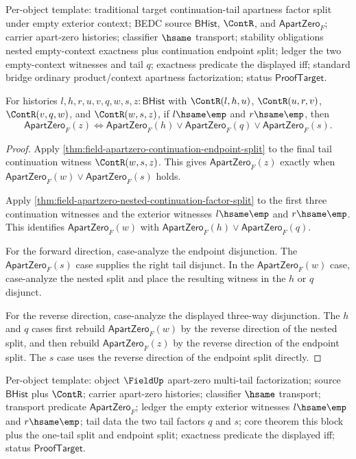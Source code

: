 Per-object template: traditional target continuation-tail apartness factor
split under empty exterior context; BEDC source $\mathsf{BHist}$, $\ContR$,
and $\mathsf{ApartZero}_F$; carrier apart-zero histories; classifier $\hsame$
transport; stability obligations nested empty-context exactness plus
continuation endpoint split; ledger the two empty-context witnesses and tail
$q$; exactness predicate the displayed iff; standard bridge ordinary
product/context apartness factorization; status $\mathsf{ProofTarget}$.

\begin{theorem}
\label{thm:field-apartzero-two-tail-nested-continuation-factor-split}
For histories $l,h,r,u,v,q,w,s,z:\mathsf{BHist}$ with $\ContR(l,h,u)$,
$\ContR(u,r,v)$, $\ContR(v,q,w)$, and $\ContR(w,s,z)$, if
$l\hsame\emp$ and $r\hsame\emp$, then
$$
\mathsf{ApartZero}_F(z)
\Longleftrightarrow
\mathsf{ApartZero}_F(h)\lor\mathsf{ApartZero}_F(q)\lor\mathsf{ApartZero}_F(s).
$$
\end{theorem}
\begin{proof}
Apply \autoref{thm:field-apartzero-continuation-endpoint-split} to the final
tail continuation witness $\ContR(w,s,z)$. This gives
$\mathsf{ApartZero}_F(z)$ exactly when
$\mathsf{ApartZero}_F(w)\lor\mathsf{ApartZero}_F(s)$ holds.

Apply \autoref{thm:field-apartzero-nested-continuation-factor-split} to the
first three continuation witnesses and the exterior witnesses $l\hsame\emp$
and $r\hsame\emp$. This identifies $\mathsf{ApartZero}_F(w)$ with
$\mathsf{ApartZero}_F(h)\lor\mathsf{ApartZero}_F(q)$.

For the forward direction, case-analyze the endpoint disjunction. The
$\mathsf{ApartZero}_F(s)$ case supplies the right tail disjunct. In the
$\mathsf{ApartZero}_F(w)$ case, case-analyze the nested split and place the
resulting witness in the $h$ or $q$ disjunct.

For the reverse direction, case-analyze the displayed three-way disjunction.
The $h$ and $q$ cases first rebuild $\mathsf{ApartZero}_F(w)$ by the reverse
direction of the nested split, and then rebuild $\mathsf{ApartZero}_F(z)$ by
the reverse direction of the endpoint split. The $s$ case uses the reverse
direction of the endpoint split directly.
\end{proof}

Per-object template: object $\FieldUp$ apart-zero multi-tail factorization;
source $\mathsf{BHist}$ plus $\ContR$; carrier apart-zero histories;
classifier $\hsame$ transport; transport predicate $\mathsf{ApartZero}_F$;
ledger the empty exterior witnesses $l\hsame\emp$ and $r\hsame\emp$; tail
data the two tail factors $q$ and $s$; core theorem this block plus the
one-tail split and endpoint split; exactness predicate the displayed iff;
status $\mathsf{ProofTarget}$.

